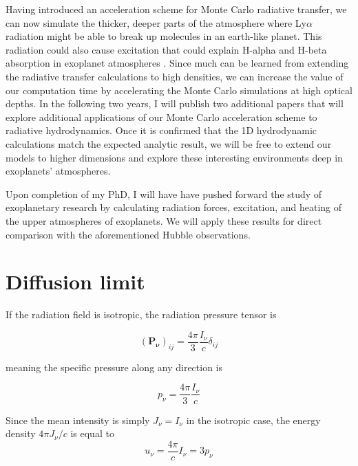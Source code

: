 \documentclass[onecolumn]{aastex63}
\begin{document}
Having introduced an acceleration scheme for Monte Carlo radiative transfer, we can now simulate the thicker, deeper parts of the atmosphere where Ly$\alpha$ radiation might be able to break up molecules in an earth-like planet. This radiation could also cause excitation that could explain H-alpha and H-beta absorption in exoplanet atmospheres \citep{2017ApJ...851..150H}. Since much can be learned from extending the radiative transfer calculations to high densities, we can increase the value of our computation time by accelerating the Monte Carlo simulations at high optical depths. In the following two years, I will publish two additional papers that will explore additional applications of our Monte Carlo acceleration scheme to radiative hydrodynamics. Once it is confirmed that the 1D hydrodynamic calculations match the expected analytic result, we will be free to extend our models to higher dimensions and explore these interesting environments deep in exoplanets' atmospheres.

Upon completion of my PhD, I will have have pushed forward the study of exoplanetary research by calculating radiation forces, excitation, and heating of the upper atmospheres of exoplanets. We will apply these results for direct comparison with the aforementioned Hubble observations.

\appendix
\section{Diffusion limit} \label{diffusion}

If the radiation field is isotropic, the radiation pressure tensor is

\begin{equation}
    (\mathbf{P_\nu})_{ij} = \frac{4\pi}{3}\frac{I_\nu}{c}\delta_{ij}
\end{equation}

\noindent meaning the specific pressure along any direction is 

\begin{equation}
    p_\nu = \frac{4\pi}{3}\frac{I_\nu}{c}
\end{equation}

\noindent Since the mean intensity is simply $J_\nu = I_\nu$ in the isotropic case, the energy density $4\pi J_\nu/c$ is equal to
\begin{equation}
    u_\nu = \frac{4\pi}{c}I_\nu = 3p_\nu
\end{equation}

{}

\end{document}
